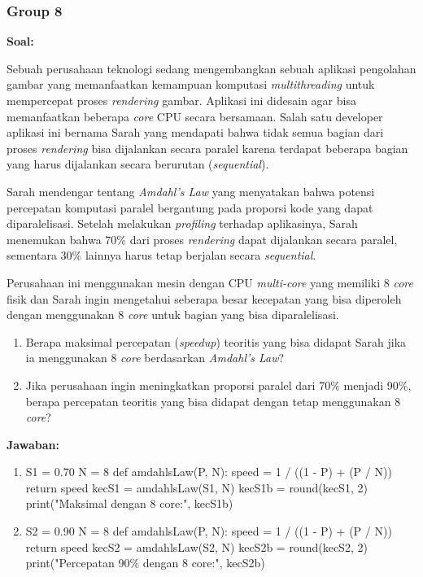 \documentclass[12pt]{article}
\begin{document}
\subsubsection{Group 8}
\textbf{Soal:}
\par Sebuah perusahaan teknologi sedang mengembangkan sebuah aplikasi pengolahan gambar yang memanfaatkan kemampuan komputasi \textit{multithreading} untuk mempercepat proses \textit{rendering} gambar. Aplikasi ini didesain agar bisa memanfaatkan beberapa \textit{core} CPU secara bersamaan. Salah satu developer aplikasi ini bernama Sarah yang mendapati bahwa tidak semua bagian dari proses \textit{rendering} bisa dijalankan secara paralel karena terdapat beberapa bagian yang harus dijalankan secara berurutan (\textit{sequential}).
\par Sarah mendengar tentang \textit{Amdahl’s Law} yang menyatakan bahwa potensi percepatan komputasi paralel bergantung pada proporsi kode yang dapat diparalelisasi. Setelah melakukan \textit{profiling} terhadap aplikasinya, Sarah menemukan bahwa 70\% dari proses \textit{rendering} dapat dijalankan secara paralel, sementara 30\% lainnya harus tetap berjalan secara \textit{sequential}.
\par Perusahaan ini menggunakan mesin dengan CPU \textit{multi-core} yang memiliki 8 \textit{core} fisik dan Sarah ingin mengetahui seberapa besar kecepatan yang bisa diperoleh dengan menggunakan 8 \textit{core} untuk bagian yang bisa diparalelisasi.
\begin{enumerate}
    \item Berapa maksimal percepatan (\textit{speedup}) teoritis yang bisa didapat Sarah jika ia menggunakan 8 \textit{core} berdasarkan \textit{Amdahl’s Law}?
    \item Jika perusahaan ingin meningkatkan proporsi paralel dari 70\% menjadi 90\%, berapa percepatan teoritis yang bisa didapat dengan tetap menggunakan 8 \textit{core}?
\end{enumerate}
\par \textbf{Jawaban:}
\begin{enumerate}
    \item \begin{python}
        S1 = 0.70 
        N = 8
        def amdahlsLaw(P, N):
            speed = 1 / ((1 - P) + (P / N))
            return speed
        kecS1 = amdahlsLaw(S1, N)
        kecS1b = round(kecS1, 2)
        print("Maksimal dengan 8 core:", kecS1b)
    \end{python}
    \item \begin{python}
        S2 = 0.90
        N = 8
        def amdahlsLaw(P, N):
            speed = 1 / ((1 - P) + (P / N))
            return speed
        kecS2 = amdahlsLaw(S2, N)
        kecS2b = round(kecS2, 2)
        print("Percepatan 90\% dengan 8 core:", kecS2b)
    \end{python}
\end{enumerate}
\end{document}
